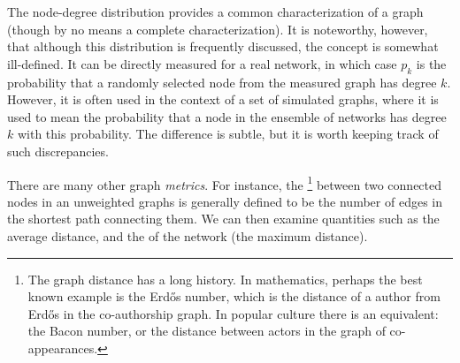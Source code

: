 The node-degree distribution provides a common characterization of a
graph (though by no means a complete characterization).  It is
noteworthy, however, that although this distribution is frequently
discussed, the concept is somewhat ill-defined. It can be directly
measured for a real network, in which case $p_k$ is the probability
that a randomly selected node from the measured graph has degree
$k$. However, it is often used in the context of a set of simulated
graphs, where it is used to mean the probability that a node in the
ensemble of networks has degree $k$ with this probability. The
difference is subtle, but it is worth keeping track of such
discrepancies.






There are many other graph {\em metrics}. For instance, the
\footnote{The graph distance has a long history. In
  mathematics, perhaps the best known example is the Erd\H{o}s number,
  which is the distance of a author from Erd\H{o}s in the
  co-authorship graph. In popular culture there is an equivalent: the
  Bacon number, or the distance between actors in the graph of
  co-appearances.} between two connected nodes in an unweighted graphs
is generally defined to be the number of edges in the shortest path
connecting them. We can then examine quantities such as the average
distance, and the  of the network (the maximum
distance).

